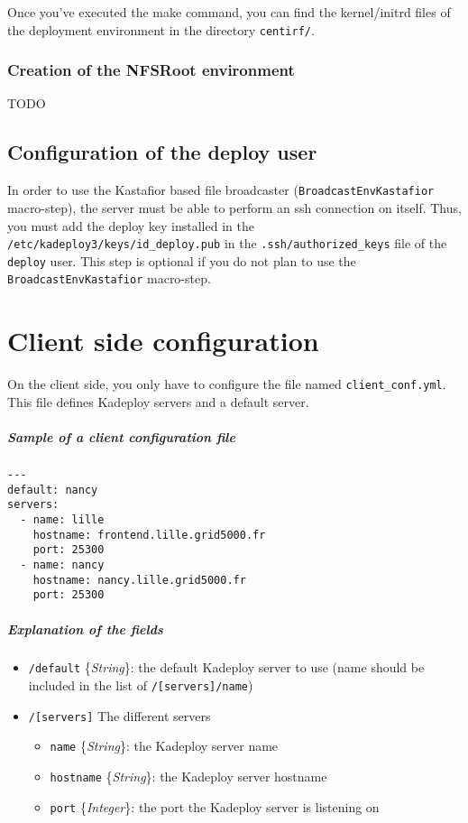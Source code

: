 \documentclass[a4wide,10pt,oneside]{book}
\newcommand{\ypath}[1]{\texttt{#1}}
\newcommand{\yfield}[2]{\texttt{#1} {\small\{{\emph{#2}}\}}:}
\begin{document}
Once you've executed the make command, you can find the kernel/initrd files of the deployment environment in the directory \texttt{centirf/}.

\subsection{Creation of the NFSRoot environment}
TODO

\section{Configuration of the deploy user}
In order to use the Kastafior based file broadcaster (\texttt{BroadcastEnvKastafior} macro-step), the server must be able to perform an ssh connection on itself. Thus, you must add the deploy key installed in the \texttt{/etc/kadeploy3/keys/id\_deploy.pub} in the \texttt{.ssh/authorized\_keys} file of the \texttt{deploy} user. This step is optional if you do not plan to use the \texttt{BroadcastEnvKastafior} macro-step.

\chapter{Client side configuration}
On the client side, you only have to configure the file named \texttt{client\_conf.yml}. This file defines Kadeploy servers and a default server.

\paragraph{Sample of a client configuration file}
\begin{verbatim}
---
default: nancy
servers:
  - name: lille
    hostname: frontend.lille.grid5000.fr
    port: 25300
  - name: nancy
    hostname: nancy.lille.grid5000.fr
    port: 25300
\end{verbatim}

\paragraph{Explanation of the fields\\}
\begin{itemize}
  \item \yfield{\ypath{/default}}{String} the default Kadeploy server to use (name should be included in the list of \ypath{/[servers]/name})
  \item \ypath{/[servers]} The different servers
  \begin{itemize}
    \item \yfield{name}{String} the Kadeploy server name
    \item \yfield{hostname}{String} the Kadeploy server hostname
    \item \yfield{port}{Integer} the port the Kadeploy server is listening on
  \end{itemize}
\end{itemize}
\end{document}
